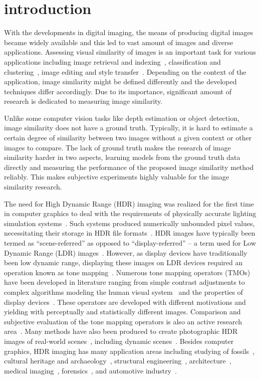 \chapter{introduction}
\label{chp:b1}
With the developments in digital imaging, the means of producing digital images became widely available and this led to vast amount of images and diverse applications. Assessing visual similarity of images is an important task for various applications including image retrieval and indexing~\cite{liu2007survey}, classification and clustering~\cite{kleiman2016toward}, image editing and style transfer~\cite{rawat2018find}. Depending on the context of the application, image similarity might be defined differently and the developed techniques differ accordingly. Due to its importance, significant amount of research is dedicated to measuring image similarity. 

Unlike some computer vision tasks like depth estimation or object detection, image similarity does not have a ground truth. Typically, it is hard to estimate a certain degree of similarity between two images without a given context or other images to compare. The lack of ground truth makes the research of image similarity harder in two aspects, learning models from the ground truth data directly and measuring the performance of the proposed image similarity method reliably. This makes subjective experiments highly valuable for the image similarity research.

The need for High Dynamic Range (HDR) imaging was realized for the first time in computer graphics to deal with the requirements of physically accurate lighting simulation systems~\cite{glassner1995principles}. Such systems produced numerically unbounded pixel values, necessitating their storage in HDR file formats~\cite{ward1998rendering}. HDR images have typically been termed as ``scene-referred'' as opposed to ``display-referred'' -- a term used for Low Dynamic Range (LDR) images~\cite{Rein2010}. However, as display devices have traditionally been low dynamic range, displaying these images on LDR devices required an operation known as tone mapping~\cite{Tumb93,Ward97}. Numerous tone mapping operators (TMOs) have been developed in literature ranging from simple contrast adjustments to complex algorithms modeling the human visual system~\cite{Ferw96} and the properties of display devices~\cite{Mantiuk2008}. These operators are developed with different motivations and yielding with perceptually and statistically different images. Comparison and subjective evaluation of the tone mapping operators is also an active research area~\cite{kundu2017large, krasula2016preference}. Many methods have also been produced to create photographic HDR images of real-world scenes~\cite{Debe97}, including dynamic scenes~\cite{sen2012robust,kalantari2017deep}. Besides computer graphics, HDR imaging has many application areas including studying of fossils~\cite{theodor2009high}, cultural heritage and archaeology~\cite{happa2010high}, structural engineering~\cite{grinzato2009seismic}, architecture~\cite{cai2013high}, medical imaging~\cite{harifi2015efficient,rizzi2018visual}, forensics~\cite{brown2010forensic}, and automotive industry~\cite{wu2012fast}.

